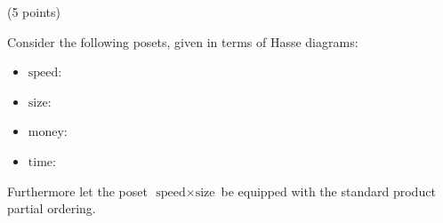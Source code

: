 \documentclass[paper=8.125in:10.250in,pagesize=pdftex,
    headinclude=false,footinclude=false,oneside,egregdoesnotlikesansseriftitles]{kaobook}
\begin{document}
\begin{gradedexercise}\label{ex:ComposingDesignProblems} (5 points) 


\newcommand{\fast}{\text{fast}}
\newcommand{\slow}{\text{slow}}
\newcommand{\llarge}{\text{large}}
\newcommand{\ssmall}{\text{small}}
\newcommand{\llong}{\text{long}}
\newcommand{\sshort}{\text{short}}
\newcommand{\speed}{\text{speed}}
\newcommand{\size}{\text{size}}
\newcommand{\money}{\text{money}}
\newcommand{\ttime}{\text{time}}
\newcommand{\cheap}{\text{cheap}}
\newcommand{\midprice}{\text{mid-price}}
\newcommand{\expensive}{\text{expensive}}
Consider the following posets, given in terms of Hasse diagrams:
\begin{itemize}
\item $\speed$:

\begin{center}
\end{center}

\item $\size$:

\begin{center}
\end{center}

\item $\money$:

\begin{center}
\end{center}

\item $\ttime$:

\begin{center}
\end{center}
\end{itemize}
Furthermore let the poset~$\speed \times \size$ be equipped with the standard product partial ordering.


\end{gradedexercise}
\end{document}
